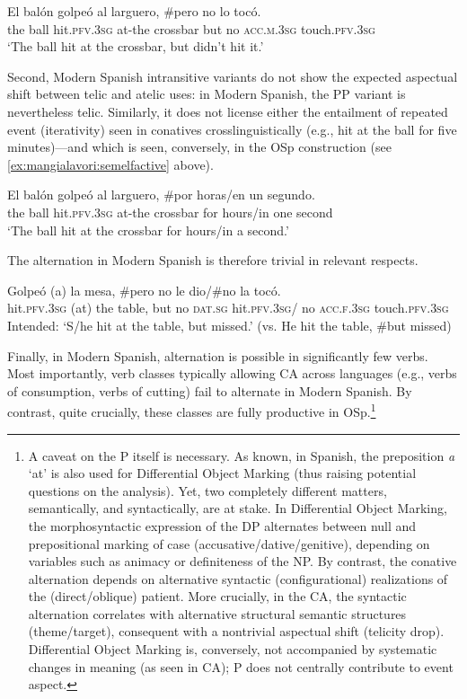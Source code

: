 \documentclass[output=paper,colorlinks,citecolor=brown,
]{langscibook}
\begin{document}
\ea
    \gll El balón golpeó al larguero, \#pero no lo tocó.\\
 the ball hit.\textsc{pfv}.\textsc{3sg} at-the crossbar but no \textsc{acc}.\textsc{m}.\textsc{3sg} touch.\textsc{pfv}.\textsc{3sg}\\
    \glt ‘The ball hit at the crossbar, but didn’t hit it.’
\z 

Second, Modern Spanish intransitive variants do not show the expected aspectual shift between telic and atelic uses: in Modern Spanish, the PP variant is nevertheless telic. Similarly, it does not license either the entailment of repeated event (iterativity) seen in conatives crosslinguistically (e.g., hit at the ball for five minutes)—and which is seen, conversely, in the OSp construction (see  \ref{ex:mangialavori:semelfactive} above). 

\ea
    \gll El balón golpeó al larguero, \#por horas/en un segundo.\\
 the ball hit.\textsc{pfv}.\textsc{3sg} at-the crossbar for hours/in one second \\
    \glt ‘The ball hit at the crossbar for hours/in a second.’
\z 

The alternation in Modern Spanish is therefore trivial in relevant respects. 

\ea
    \gll Golpeó (a) la mesa, \#pero no le dio/\#no la tocó.\\
 hit.\textsc{pfv}.\textsc{3sg} (at) the table, but no \textsc{dat}.\textsc{sg} hit.\textsc{pfv}.\textsc{3sg}/ no \textsc{acc}.\textsc{f}.\textsc{3sg} touch.\textsc{pfv}.\textsc{3sg}\\
    \glt Intended: ‘S/he hit at the table, but missed.’ (vs. He hit the table, \#but missed)
\z 

Finally, in Modern Spanish, alternation is possible in significantly few verbs. Most importantly, verb classes typically allowing CA across languages (e.g., verbs of consumption, verbs of cutting) fail to alternate in Modern Spanish. By contrast, quite crucially, these classes are fully productive in OSp.\footnote{A caveat on the P itself is necessary. As known, in Spanish, the preposition \textit{a} ‘at’ is also used for Differential Object Marking (thus raising potential questions on the analysis). Yet, two completely different matters, semantically, and syntactically, are at stake. In Differential Object Marking, the morphosyntactic expression of the DP alternates between null and prepositional marking of case (accusative/dative/genitive), depending on variables such as animacy or definiteness of the NP. By contrast, the conative alternation depends on alternative syntactic (configurational) realizations of the (direct/oblique) patient. More crucially, in the CA, the syntactic alternation correlates with alternative structural semantic structures (theme/target), consequent with a nontrivial aspectual shift (telicity drop). Differential Object Marking is, conversely, not accompanied by systematic changes in meaning (as seen in CA); P does not centrally contribute to event aspect.}
\end{document}
